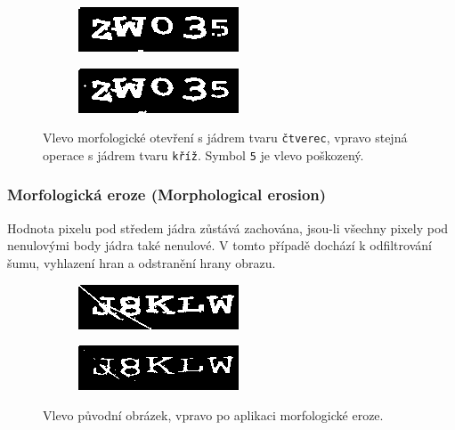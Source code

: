 \documentclass[
  field=ainfp,
  master=true,
  biblatex,
  sourcecodes=false,
  theorems=false,
  glossaries,
  index
]{kidiplom}
\begin{document}
\begin{figure}[H]
\centering
\begin{subfigure}{.5\textwidth}
  \centering
  \includegraphics[width=.8\linewidth]{images/kernel_square.png}
\end{subfigure}%
\begin{subfigure}{.5\textwidth}
  \centering
  \includegraphics[width=.8\linewidth]{images/kernel_cross.png}
\end{subfigure}
\caption{Vlevo morfologické otevření s jádrem tvaru \texttt{čtverec}, vpravo stejná operace s jádrem tvaru \texttt{kříž}. Symbol \texttt{5} je vlevo poškozený.}
\label{fig:inverse_example}
\end{figure}

\subsubsection*{Morfologická eroze (Morphological erosion)}
Hodnota pixelu pod středem jádra zůstává zachována, jsou-li všechny pixely pod nenulovými body jádra také nenulové. V tomto případě dochází k odfiltrování šumu, vyhlazení hran a odstranění hrany obrazu.
\begin{figure}[H]
\centering
\begin{subfigure}{.5\textwidth}
  \centering
  \includegraphics[width=.8\linewidth]{images/erosion_original.png}
\end{subfigure}%
\begin{subfigure}{.5\textwidth}
  \centering
  \includegraphics[width=.8\linewidth]{images/erosion_result.png}
\end{subfigure}
\caption{Vlevo původní obrázek, vpravo po aplikaci morfologické eroze.}
\label{fig:inverse_example}
\end{figure}
\end{document}
